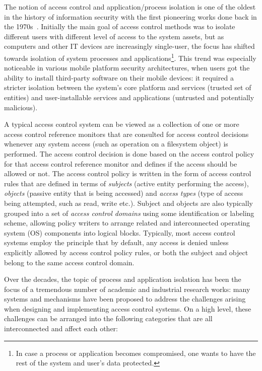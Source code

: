 
The notion of access control and application/process isolation is one of the oldest in the history of information security with the first pioneering works done back in the 1970s~\cite{saltzer75, Denning76}. Initially the main goal of access control methods was to isolate different users with different level of access to the system assets, but as computers and other IT devices are increasingly single-user, the focus has shifted towards isolation of system processes and applications\footnote{In case a process or application becomes compromised, one wants to have the rest of the system and user's data protected.}.
 This trend was especially noticeable in various mobile platform security architectures, when users got the ability to install third-party software on their mobile devices: it required a stricter isolation between the system's core platform and services (trusted set of entities) and user-installable services and applications (untrusted and potentially malicious).

A typical access control system can be viewed as a collection of one or more access control reference monitors that are consulted for access control decisions whenever any system access (such as operation on a filesystem object) is performed. The access control decision is done based on the access control policy for that access control reference monitor and defines if the access should be allowed or not. The access control policy is written in the form of access control rules that are defined in terms of \textit{subjects} (active entity performing the access), \textit{objects} (passive entity that is being accessed) and \textit{access types} (type of access being attempted, such as read, write etc.). Subject and objects are also typically grouped into a set of \textit{access control domains} using some identification or labeling scheme, allowing policy writers to arrange related and interconnected operating system (OS) components into logical blocks. Typically, most access control systems employ the principle that by default, any access is denied unless explicitly allowed by access control policy rules, or both the subject and object belong to the same access control domain.
 
Over the decades, the topic of process and application isolation has been the focus of a tremendous number of academic and industrial research works: many systems and mechanisms have been proposed to address the challenges arising when designing and implementing access control systems. On a high level, these challenges can be arranged into the following categories that are all interconnected and affect each other: 

